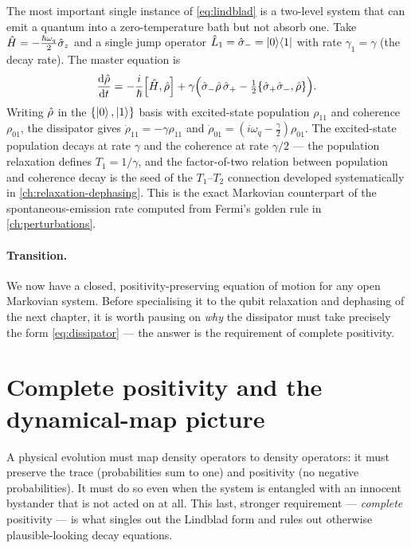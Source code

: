 \begin{example}
\label{ex:amplitude-damping}
The most important single instance of \cref{eq:lindblad} is a
two-level system that can emit a quantum into a zero-temperature
bath but not absorb one. Take $\hat{H}=-\tfrac{\hbar\omega_q}{2}\hat\sigma_z$
and a single jump operator $\hat{L}_1=\hat\sigma_-=\ket{0}\!\bra{1}$
with rate $\gamma_1=\gamma$ (the decay rate). The master equation
is
\begin{equation}
\label{eq:amplitude-damping-me}
\frac{\dd\op\rho}{\dd t}
= -\frac{i}{\hbar}\comm{\op H}{\op\rho}
+ \gamma\Bigl(\hat\sigma_-\op\rho\,\hat\sigma_+
- \tfrac12\acomm{\hat\sigma_+\hat\sigma_-}{\op\rho}\Bigr).
\end{equation}
Writing $\hat{\rho}$ in the
$\{\ket{0},\ket{1}\}$ basis with excited-state population
$\rho_{11}$ and coherence $\rho_{01}$, the dissipator gives
$\dot\rho_{11}=-\gamma\rho_{11}$ and
$\dot\rho_{01}=(i\omega_q-\tfrac{\gamma}{2})\rho_{01}$. The
excited-state population decays at rate $\gamma$ and the coherence
at rate $\gamma/2$ --- the population relaxation defines $T_1=1/\gamma$,
and the factor-of-two relation between population and coherence
decay is the seed of the $T_1$--$T_2$ connection developed
systematically in \cref{ch:relaxation-dephasing}. This is the exact
Markovian counterpart of the spontaneous-emission rate computed
from Fermi's golden rule in \cref{ch:perturbations}.
\end{example}

\paragraph{Transition.}
We now have a closed, positivity-preserving equation of motion for
any open Markovian system. Before specialising it to the qubit
relaxation and dephasing of the next chapter, it is worth pausing
on \emph{why} the dissipator must take precisely the form
\cref{eq:dissipator} --- the answer is the requirement of complete
positivity.

\section{Complete positivity and the dynamical-map picture}
\label{sec:cptp}

\begin{phenomenon}
A physical evolution must map density operators to density
operators: it must preserve the trace (probabilities sum to one)
and positivity (no negative probabilities). It must do so even when
the system is entangled with an innocent bystander that is not
acted on at all. This last, stronger requirement --- \emph{complete}
positivity --- is what singles out the Lindblad form and rules out
otherwise plausible-looking decay equations.
\end{phenomenon}

